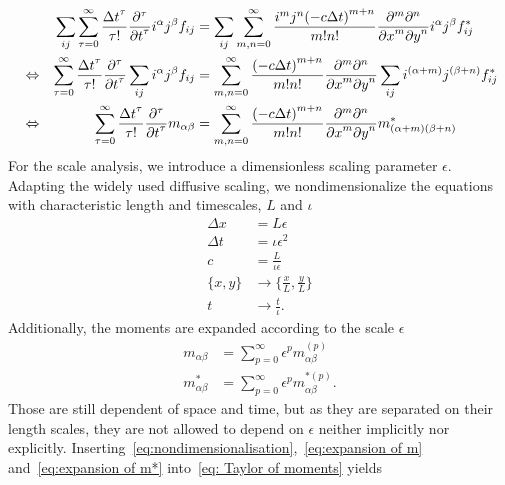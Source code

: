 \begin{align}
    \nonumber
    & & \sum_{ij} \sum_{\tau = 0}^\infty \frac{{\Delta t}^\tau }{\tau!} \frac{\partial^\tau}{{\partial t}^\tau} i^\alpha j^\beta f_{ij} &=
    \sum_{ij}\sum_{m,n = 0}^\infty \frac{i^m j^n {(-c\Delta t)}^{m+n}} {m!n!} \frac{\partial^m \partial^n}{ {\partial x}^m{\partial y}^n}i^\alpha j^\beta f^*_{ij}\\
    \nonumber
    &\Leftrightarrow &
    \sum_{\tau = 0}^\infty \frac{{\Delta t}^\tau }{\tau!} \frac{\partial^\tau}{{\partial t}^\tau} \sum_{ij}i^\alpha j^\beta f_{ij} &=
    \sum_{m,n = 0}^\infty \frac{{(-c\Delta t)}^{m+n}} {m!n!} \frac{\partial^m \partial^n}{ {\partial x}^m{\partial y}^n}\sum_{ij}i^{(\alpha + m)} j^{(\beta+n)} f^*_{ij}\\
      \label{eq: Taylor of moments}
     &\Leftrightarrow &
     \sum_{\tau = 0}^\infty \frac{{\Delta t}^\tau }{\tau!} \frac{\partial^\tau}{{\partial t}^\tau} m_{\alpha\beta} &=
    \sum_{m,n = 0}^\infty \frac{{(-c\Delta t)}^{m+n}} {m!n!} \frac{\partial^m \partial^n}{ {\partial x}^m{\partial y}^n} m^*_{(\alpha + m)(\beta + n)}
\end{align}
For the scale analysis, we introduce a dimensionless scaling parameter $\epsilon$.
Adapting the widely used diffusive scaling, we nondimensionalize the equations with characteristic length and timescales, $L$ and $\iota$
\begin{equation}
  \label{eq:nondimensionalisation}
  \begin{aligned}
    \Delta x & = L\epsilon \\
    \Delta t & = \iota\epsilon^2 \\
    c & = \frac{L}{\iota\epsilon} \\
    \{x, y\} & \rightarrow \{\frac{x}{L}, \frac{y}{L}\} \\
    t & \rightarrow \frac{t}{\iota}.
  \end{aligned}
\end{equation}
Additionally, the moments are expanded according to the scale $\epsilon$
\begin{align}
    \label{eq:expansion of m}
    m_{\alpha\beta} & = \sum_{p=0}^{\infty} \epsilon^p m_{\alpha\beta}^{(p)} \\
    \label{eq:expansion of m*}
    m^*_{\alpha\beta} & = \sum_{p=0}^{\infty} \epsilon^p m_{\alpha\beta}^{*(p)}.
\end{align}
Those are still dependent of space and time, but as they are separated on their length scales, they are not allowed to depend on $\epsilon$ neither implicitly nor explicitly.
Inserting~\eqref{eq:nondimensionalisation},~\eqref{eq:expansion of m} and~\eqref{eq:expansion of m*} into~\eqref{eq: Taylor of moments} yields

